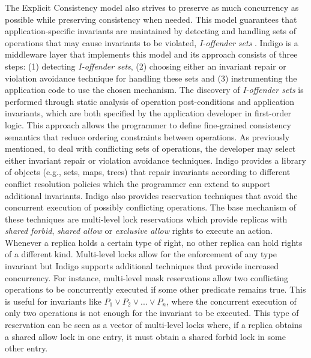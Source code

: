 \documentclass[runningheads,a4paper]{llncs}
\begin{document}
The Explicit Consistency model also strives to preserve as much concurrency as possible while preserving consistency when needed. This model guarantees that application-specific invariants are maintained by detecting and handling sets of operations that may cause invariants to be violated, \textit{I-offender sets} \cite{Balegas2015}. Indigo is a middleware layer that implements this model and its approach consists of three steps: (1) detecting \textit{I-offender sets}, (2) choosing either an invariant repair or violation avoidance technique for handling these sets and (3) instrumenting the application code to use the chosen mechanism. The discovery of \textit{I-offender sets} is performed through static analysis of operation post-conditions and application invariants, which are both specified by the application developer in first-order logic. This approach allows the programmer to define fine-grained consistency semantics that reduce ordering constraints between operations. As previously mentioned, to deal with conflicting sets of operations, the developer may select either invariant repair or violation avoidance techniques. Indigo provides a library of objects (e.g., sets, maps, trees) that repair invariants according to different conflict resolution policies which the programmer can extend to support additional invariants. Indigo also provides reservation techniques that avoid the concurrent execution of possibly conflicting operations. The base mechanism of these techniques are multi-level lock reservations which provide replicas with \textit{shared forbid}, \textit{shared allow} or \textit{exclusive allow} rights to execute an action. Whenever a replica holds a certain type of right, no other replica can hold rights of a different kind. Multi-level locks allow for the enforcement of any type invariant but Indigo supports additional techniques that provide increased concurrency. For instance, multi-level mask reservations allow two conflicting operations to be concurrently executed if some other predicate remains true. This is useful for invariants like $P_1 \vee P_2 \vee ... \vee P_n$, where the concurrent execution of only two operations is not enough for the invariant to be executed. This type of reservation can be seen as a vector of multi-level locks where, if a replica obtains a shared allow lock in one entry, it must obtain a shared forbid lock in some other entry. 
\end{document}
